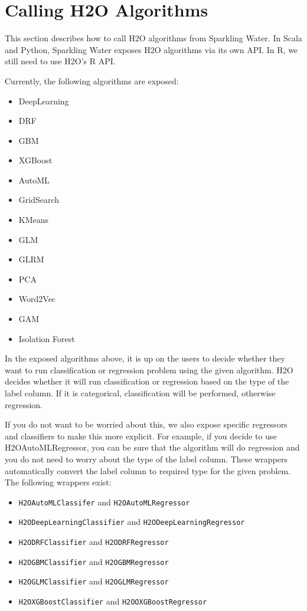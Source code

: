 \documentclass{standalone}
\begin{document}
	\section{Calling H2O Algorithms}

	This section describes how to call H2O algorithms from Sparkling Water. In Scala and Python, Sparkling Water
	exposes H2O algorithms via its own API. In R, we still need to use H2O's R API.

	Currently, the following algorithms are exposed:

	\begin{itemize}
		\item DeepLearning
		\item DRF
		\item GBM
		\item XGBoost
		\item AutoML
		\item GridSearch
		\item KMeans
		\item GLM
		\item GLRM
		\item PCA
		\item Word2Vec
		\item GAM
		\item Isolation Forest
	\end{itemize}

	In the exposed algorithms above, it is up on the users to decide whether they want to run classification or
	regression problem using the given algorithm. H2O decides whether it will run classification or regression based
	on the type of the label column. If it is categorical, classification will be performed, otherwise regression.

	If you do not want to be worried about this, we also expose specific regressors and classifiers to make this more
	explicit. For example, if you decide to use H2OAutoMLRegressor, you can be sure that the algorithm will do regression
	and you do not need to worry about the type of the label column. These wrappers automatically convert the label
	column to required type for the given problem. The following wrappers exist:

	\begin{itemize}
		\item \texttt{H2OAutoMLClassifer} and \texttt{H2OAutoMLRegressor}
		\item \texttt{H2ODeepLearningClassifier} and \texttt{H2ODeepLearningRegressor}
		\item \texttt{H2ODRFClassifier} and \texttt{H2ODRFRegressor}
		\item \texttt{H2OGBMClassifier} and \texttt{H2OGBMRegressor}
		\item \texttt{H2OGLMClassifier} and \texttt{H2OGLMRegressor}
		\item \texttt{H2OXGBoostClassifier} and \texttt{H2OOXGBoostRegressor}
	\end{itemize}
\end{document}

